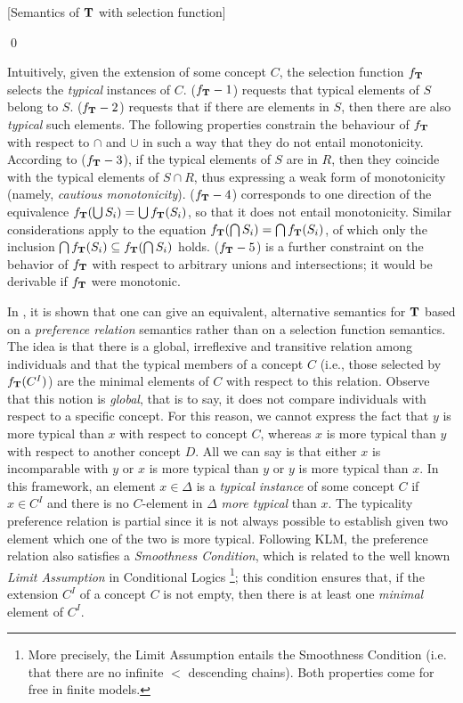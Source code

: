 \documentclass[a4paper, 11pt, oneside]{duthesis}
\newcommand{\tip}{{\bf T}}
\newcommand{\incluso} {\subseteq}
\newenvironment{definition}
{\begin{defi} \rm}{\qed \end{defi}}
\newenvironment{definition}
{\begin{defi} \rm}{\qed \end{defi}}
\newtheorem{definition}{Definition}
\newcounter{posu}
\newtheorem{definition}[posu]{Definition}
\begin{document}
\begin{definition}[Semantics of $\tip$ with selection function]
\begin{itemize}
\end{itemize}

\end{definition}

\noindent Intuitively, given the extension of some concept $C$, the selection function $f_\tip$ selects  the {\em typical} instances of $C$.
($f_\tip-1$) requests that typical elements of $S$ belong to $S$.
($f_\tip-2$) requests that if there are elements in $S$, then there are also {\em typical} such elements.
The following properties constrain the behaviour of $f_\tip$ with respect to $\cap$ and $\cup$ in such a way that they do not entail monotonicity.
According to ($f_\tip-3$), if the typical elements of $S$ are in $R$, then they coincide with the typical elements of $S \cap R$, thus expressing a weak form of monotonicity (namely, {\em cautious monotonicity}).
($f_\tip-4$) corresponds to one direction of the equivalence $f_\tip(\bigcup S_i) = \bigcup f_\tip(S_i)$, so that it does not entail monotonicity.
Similar considerations apply to the equation $f_\tip(\bigcap S_i) = \bigcap f_\tip(S_i)$, of which only the inclusion $\bigcap f_\tip(S_i) \incluso f_\tip(\bigcap S_i)$ holds. ($f_\tip-5$) is a further constraint on the behavior of $f_\tip$ with respect to arbitrary unions and intersections; it would be derivable if $f_\tip$ were monotonic.

In \cite{FI09}, it is shown that one can give an equivalent, alternative semantics for $\tip$ based on a \emph{preference relation} semantics rather than on a selection function semantics.
The idea is that there is a global, irreflexive and transitive relation among individuals and that the typical members of a concept $C$ (i.e., those selected by $f_\tip(C^I)$) are the minimal elements of $C$ with respect to this relation.
Observe that this notion is \emph{global}, that is to say, it does not compare individuals with respect to a specific concept.
For this reason,  we cannot express the fact that $y$ is more typical than $x$ with respect to concept $C$, whereas $x$ is more typical than $y$ with respect to another concept $D$.
All we can say is that either $x$ is incomparable with $y$ or $x$ is more typical than $y$ or $y$ is more typical than $x$.
In this framework, an element $x \in \Delta$ is a {\em typical instance} of some concept $C$ if $x \in C^I$ and there is no $C$-element in $\Delta$ {\em more typical} than $x$.
The typicality preference relation is partial since it is not always possible to establish given two element which one of the two is more typical.
Following KLM, the preference relation also satisfies a \emph{Smoothness Condition}, which is related to the well known \emph{Limit Assumption} in Conditional Logics \cite{Nute80}
\footnote{More precisely, the Limit Assumption entails the Smoothness Condition (i.e. that there are no infinite $<$ descending chains). Both properties come for free in finite models.};
this condition ensures that, if the extension $C^I$ of a concept $C$ is not empty, then there is at least one \emph{minimal} element of $C^I$.
\end{document}
